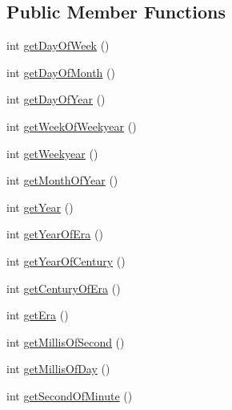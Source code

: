 \subsection*{Public Member Functions}
\begin{DoxyCompactItemize}
\item 
int \hyperlink{interfaceorg_1_1joda_1_1time_1_1_readable_date_time_a7592092d328d870a9df460c60ffef8f5}{get\-Day\-Of\-Week} ()
\item 
int \hyperlink{interfaceorg_1_1joda_1_1time_1_1_readable_date_time_a47bc461b2bfaa131ca55ef0c0765adc1}{get\-Day\-Of\-Month} ()
\item 
int \hyperlink{interfaceorg_1_1joda_1_1time_1_1_readable_date_time_a6d99d4ffac2857bdd80028382c4138dc}{get\-Day\-Of\-Year} ()
\item 
int \hyperlink{interfaceorg_1_1joda_1_1time_1_1_readable_date_time_aafce6737b6c450e16d8f97e29558980b}{get\-Week\-Of\-Weekyear} ()
\item 
int \hyperlink{interfaceorg_1_1joda_1_1time_1_1_readable_date_time_a6eee2f7c1a1561d6bfc8c02c3968aeb8}{get\-Weekyear} ()
\item 
int \hyperlink{interfaceorg_1_1joda_1_1time_1_1_readable_date_time_aafafdf91888de6ded957b3fcde601b5d}{get\-Month\-Of\-Year} ()
\item 
int \hyperlink{interfaceorg_1_1joda_1_1time_1_1_readable_date_time_a5709e1c1aed39eefe45af6e2d2dcec76}{get\-Year} ()
\item 
int \hyperlink{interfaceorg_1_1joda_1_1time_1_1_readable_date_time_ad9a8270b394d5a49380c81be36ae39f3}{get\-Year\-Of\-Era} ()
\item 
int \hyperlink{interfaceorg_1_1joda_1_1time_1_1_readable_date_time_a54135308938e73641fc6cf03d6b0561c}{get\-Year\-Of\-Century} ()
\item 
int \hyperlink{interfaceorg_1_1joda_1_1time_1_1_readable_date_time_adb61c65c27db5484f0745f7672ec0aa9}{get\-Century\-Of\-Era} ()
\item 
int \hyperlink{interfaceorg_1_1joda_1_1time_1_1_readable_date_time_af176abd8c043b26c8a0ed046023cceeb}{get\-Era} ()
\item 
int \hyperlink{interfaceorg_1_1joda_1_1time_1_1_readable_date_time_acef5e9e493198f6f130927d20ad28927}{get\-Millis\-Of\-Second} ()
\item 
int \hyperlink{interfaceorg_1_1joda_1_1time_1_1_readable_date_time_af82a4035a18509e80eb7d0256df68f4b}{get\-Millis\-Of\-Day} ()
\item 
int \hyperlink{interfaceorg_1_1joda_1_1time_1_1_readable_date_time_a9f62cfba3dd7c6711be413bd92479ee0}{get\-Second\-Of\-Minute} ()

\end{DoxyCompactItemize}
